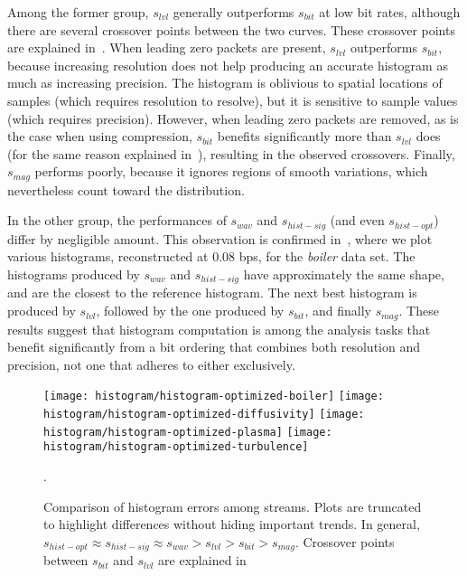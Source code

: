 Among the former group, $s_{lvl}$ generally outperforms $s_{bit}$ at low bit rates, although there
are several crossover points between the two curves. These crossover points are explained
in~. When leading zero packets are present, $s_{lvl}$
outperforms $s_{bit}$, because increasing resolution does
not help producing an accurate histogram as much as increasing precision. The histogram is oblivious
to spatial locations of samples (which requires resolution to resolve), but it is sensitive to
sample values (which requires precision). However, when leading zero packets are removed, as is the
case when using compression, $s_{bit}$ benefits significantly more than $s_{lvl}$ does (for the same
reason explained in~), resulting in the observed crossovers. Finally,
$s_{mag}$ performs poorly, because it ignores regions of smooth variations, which nevertheless count
toward the distribution.

In the other group, the performances of $s_{wav}$ and $s_{hist-sig}$ (and even $s_{hist-opt}$)
differ by negligible amount. This observation is confirmed in~, where we
plot various histograms, reconstructed at 0.08 bps, for the \emph{boiler} data set. The histograms
produced by $s_{wav}$ and $s_{hist-sig}$ have approximately the same shape, and are the closest to
the reference histogram. The next best histogram is produced by $s_{lvl}$, followed by the one
produced by $s_{bit}$, and finally $s_{mag}$. These results suggest that histogram computation is
among the analysis tasks that benefit significantly from a bit ordering that combines both resolution
and precision, not one that adheres to either exclusively.

\begin{figure}[h]
	\centering
	{\texttt{[image: histogram/histogram-optimized-boiler]}}
	{\texttt{[image: histogram/histogram-optimized-diffusivity]}}
	{\texttt{[image: histogram/histogram-optimized-plasma]}}
	{\texttt{[image: histogram/histogram-optimized-turbulence]}}
	\caption{Comparison of histogram errors among streams. Plots are truncated to highlight
	differences without hiding important trends. In general, $s_{hist-opt}\approx s_{hist-sig}\approx
	s_{wav} > s_{lvl} > s_{bit} > s_{mag}$. Crossover points between $s_{bit}$ and $s_{lvl}$ are
	explained in~}.
	\label{fig:histogram-stream-comparison}
\end{figure}

